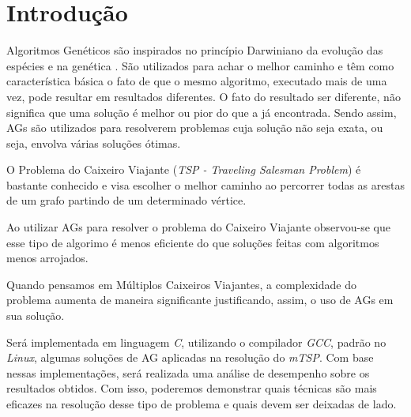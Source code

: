 \documentclass[final,5p,times,twocolumn]{elsarticle}
\begin{document}



\section{Introdução}
		
		Algoritmos Genéticos são inspirados no princípio Darwiniano da evolução das espécies e na genética \cite{0004-pdf}. 
		São utilizados para achar o melhor caminho e têm como característica básica o fato de que o mesmo algoritmo, 
		executado mais de uma vez, pode resultar em resultados diferentes. O fato do resultado ser diferente, não significa 
		que uma solução é melhor ou pior do que a já encontrada. Sendo assim, AGs são utilizados para resolverem problemas 
		cuja solução não seja exata, ou seja, envolva várias soluções ótimas.
	
		O Problema do Caixeiro Viajante (\textit{TSP - Traveling Salesman Problem}) é bastante conhecido e visa escolher o 
		melhor caminho ao percorrer todas as arestas de um grafo partindo de um determinado vértice.

		
		Ao utilizar AGs para resolver o problema do Caixeiro Viajante observou-se que esse tipo de algorimo é menos eficiente 
		do que soluções feitas com algoritmos menos arrojados.
		
		Quando pensamos em Múltiplos Caixeiros Viajantes, a complexidade do problema aumenta de maneira significante justificando, 
		assim, o uso de AGs em sua solução.
		
		
		Será implementada em linguagem \textit{C}, utilizando o compilador \textit{GCC}, padrão no \textit{Linux}, 
		algumas soluções de AG aplicadas na resolução do \textit{mTSP}. Com base nessas implementações, será 
		realizada uma análise de desempenho sobre os resultados obtidos. Com isso, poderemos demonstrar quais 
		técnicas são mais eficazes na resolução desse tipo de problema e quais devem ser deixadas de lado.
		
\end{document}
